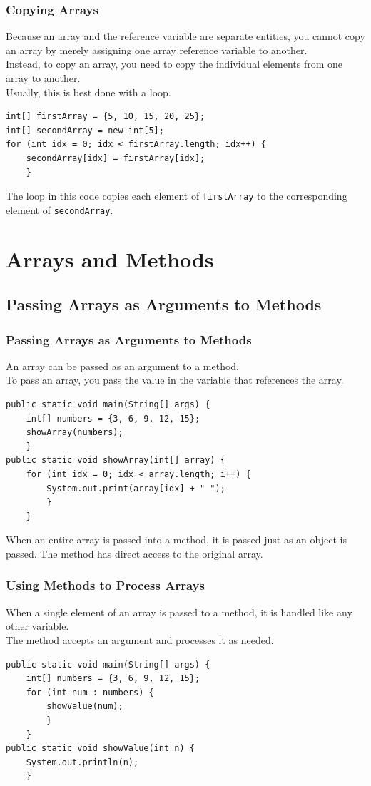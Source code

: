 \documentclass[11pt]{beamer}
\begin{document}
\begin{frame}[fragile]
    \frametitle{Copying Arrays}
    Because an array and the reference variable are separate entities, you cannot copy an array by merely assigning one array reference variable to another. \\ \vspace{1em} 
    Instead, to copy an array, you need to copy the individual elements from one array to another. \\ \vspace{1em} 
    Usually, this is best done with a loop.
    \begin{lstlisting}
int[] firstArray = {5, 10, 15, 20, 25};
int[] secondArray = new int[5];
for (int idx = 0; idx < firstArray.length; idx++) {
    secondArray[idx] = firstArray[idx];
    }
    \end{lstlisting}
    The loop in this code copies each element of \texttt{firstArray} to the corresponding element of \texttt{secondArray}.
\end{frame}

\section{Arrays and Methods}
\subsection{Passing Arrays as Arguments to Methods}
\begin{frame}[fragile]
    \frametitle{Passing Arrays as Arguments to Methods}
    An array can be passed as an argument to a method. \\ \vspace{1em}
    To pass an array, you pass the value in the variable that references the array.
    \begin{lstlisting}
public static void main(String[] args) {
    int[] numbers = {3, 6, 9, 12, 15};
    showArray(numbers);
    }
public static void showArray(int[] array) {
    for (int idx = 0; idx < array.length; i++) {
        System.out.print(array[idx] + " ");
        }
    }
    \end{lstlisting}
    When an entire array is passed into a method, it is passed just as an object is passed. The method has direct access to the original array.
\end{frame}

\begin{frame}[fragile]
    \frametitle{Using Methods to Process Arrays}
    When a single element of an array is passed to a method, it is handled like any other variable. \\ \vspace{1em}
    The method accepts an argument and processes it as needed.
    \begin{lstlisting}
public static void main(String[] args) {
    int[] numbers = {3, 6, 9, 12, 15};
    for (int num : numbers) {
        showValue(num);
        }
    }
public static void showValue(int n) {
    System.out.println(n);
    }
    \end{lstlisting}
\end{frame}
\end{document}

